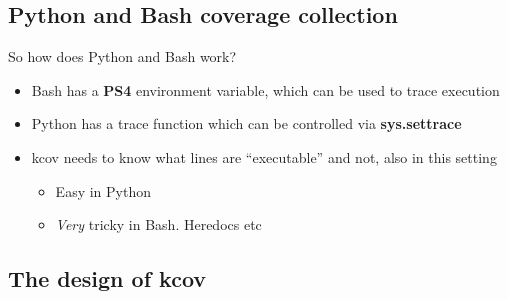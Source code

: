 \documentclass{beamer}
\begin{document}
\subsection{Python and Bash coverage collection}

\begin{frame}{So how does Python and Bash work?}
  \begin{itemize}
  \item Bash has a \textbf{PS4} environment variable, which can be used to trace execution
  \item Python has a trace function which can be controlled via \textbf{sys.settrace}
  \item kcov needs to know what lines are ``executable'' and not, also in this setting
    \begin{itemize}
    \item Easy in Python
    \item \textit{Very} tricky in Bash. Heredocs etc
    \end{itemize}
  \end{itemize}
\end{frame}

\subsection{The design of kcov}
\end{document}
